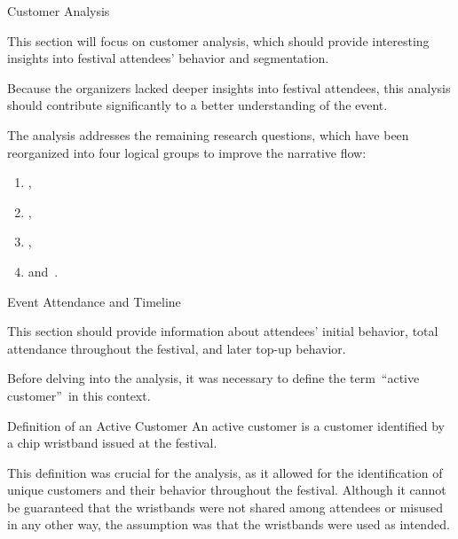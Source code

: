 \begin{section}{Customer Analysis}
	\label{sec:analysis-customers}

	This section will focus on customer analysis, which should provide interesting insights into festival attendees' behavior and segmentation.

	Because the organizers lacked deeper insights into festival attendees, this analysis should contribute significantly to a better understanding of the event.

	The analysis addresses the remaining research questions, which have been reorganized into four logical groups to improve the narrative flow:\\
	\begin{enumerate}
		\item {},
		\item {},
		\item {},
		\item and~.
	\end{enumerate}

	\begin{subsection}{Event Attendance and Timeline}
		\label{subsec:analysis-customer-event-attendance-timeline}

		This section should provide information about attendees' initial behavior, total attendance throughout the festival, and later top-up behavior.

		Before delving into the analysis, it was necessary to define the term~\enquote{active customer}~in this context.

		\begin{infobox}{Definition of an Active Customer}
			An active customer is a customer identified by a chip wristband issued at the festival.
		\end{infobox}

		This definition was crucial for the analysis, as it allowed for the identification of unique customers and their behavior throughout the festival.
		Although it cannot be guaranteed that the wristbands were not shared among attendees or misused in any other way, the assumption was that the wristbands were used as intended.


\end{subsection}
\end{section}
